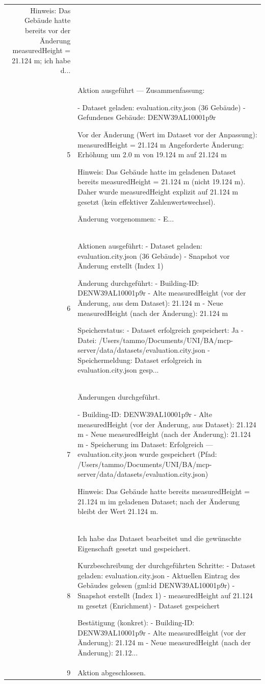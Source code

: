 \documentclass[a4paper,11pt]{article}
\begin{document}
\begin{table}[ht]
\begin{tabular}{r p{12cm}}
Hinweis: Das Gebäude hatte bereits vor der Änderung measuredHeight = 21.124 m; ich habe d... \\
5 & Aktion ausgeführt — Zusammenfassung:

- Dataset geladen: evaluation.city.json (36 Gebäude)
- Gefundenes Gebäude: DENW39AL10001p9r

Vor der Änderung (Wert im Dataset vor der Anpassung): measuredHeight = 21.124 m
Angeforderte Änderung: Erhöhung um 2.0 m von 19.124 m auf 21.124 m

Hinweis: Das Gebäude hatte im geladenen Dataset bereits measuredHeight = 21.124 m (nicht 19.124 m). Daher wurde measuredHeight explizit auf 21.124 m gesetzt (kein effektiver Zahlenwertswechsel).

Änderung vorgenommen:
- E... \\
6 & Aktionen ausgeführt:
- Dataset geladen: evaluation.city.json (36 Gebäude)
- Snapshot vor Änderung erstellt (Index 1)

Änderung durchgeführt:
- Building-ID: DENW39AL10001p9r
- Alte measuredHeight (vor der Änderung, aus dem Dataset): 21.124 m
- Neue measuredHeight (nach der Änderung): 21.124 m

Speicherstatus:
- Dataset erfolgreich gespeichert: Ja
- Datei: /Users/tammo/Documents/UNI/BA/mcp-server/data/datasets/evaluation.city.json
- Speichermeldung: Dataset erfolgreich in evaluation.city.json gesp... \\
7 & Änderungen durchgeführt.

- Building-ID: DENW39AL10001p9r
- Alte measuredHeight (vor der Änderung, aus Dataset): 21.124 m
- Neue measuredHeight (nach der Änderung): 21.124 m
- Speicherung im Dataset: Erfolgreich — evaluation.city.json wurde gespeichert (Pfad: /Users/tammo/Documents/UNI/BA/mcp-server/data/datasets/evaluation.city.json)

Hinweis: Das Gebäude hatte bereits measuredHeight = 21.124 m im geladenen Dataset; nach der Änderung bleibt der Wert 21.124 m. \\
8 & Ich habe das Dataset bearbeitet und die gewünschte Eigenschaft gesetzt und gespeichert.

Kurzbeschreibung der durchgeführten Schritte:
- Dataset geladen: evaluation.city.json
- Aktuellen Eintrag des Gebäudes gelesen (gml:id DENW39AL10001p9r)
- Snapshot erstellt (Index 1)
- measuredHeight auf 21.124 m gesetzt (Enrichment)
- Dataset gespeichert

Bestätigung (konkret):
- Building-ID: DENW39AL10001p9r
- Alte measuredHeight (vor der Änderung): 21.124 m
- Neue measuredHeight (nach der Änderung): 21.12... \\
9 & Aktion abgeschlossen.


\end{tabular}
\end{table}
\end{document}

